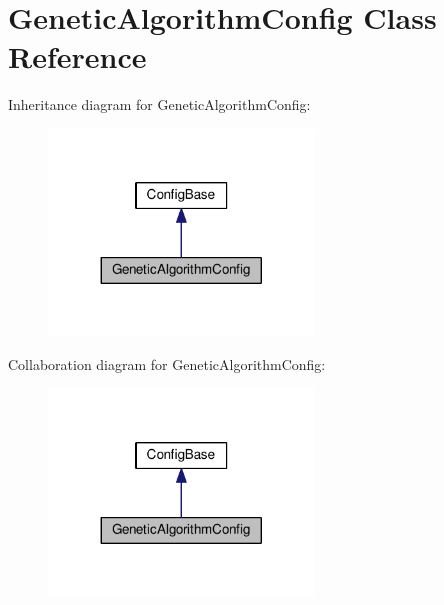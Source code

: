 \hypertarget{class_genetic_algorithm_config}{}\section{Genetic\+Algorithm\+Config Class Reference}
\label{class_genetic_algorithm_config}


Inheritance diagram for Genetic\+Algorithm\+Config\+:\nopagebreak
\begin{figure}[H]
\begin{center}
\leavevmode
\includegraphics[width=200pt]{class_genetic_algorithm_config__inherit__graph}
\end{center}
\end{figure}


Collaboration diagram for Genetic\+Algorithm\+Config\+:\nopagebreak
\begin{figure}[H]
\begin{center}
\leavevmode
\includegraphics[width=200pt]{class_genetic_algorithm_config__coll__graph}
\end{center}
\end{figure}
